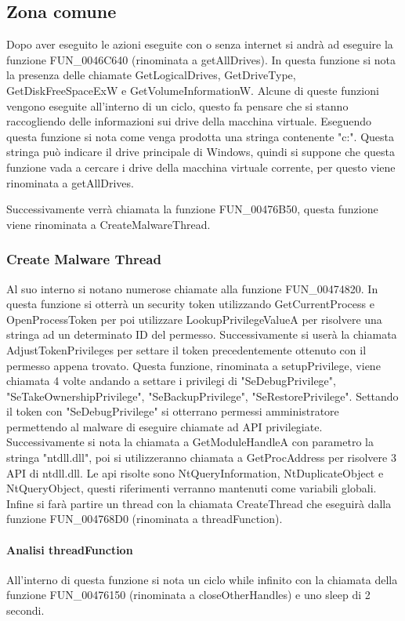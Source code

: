 \documentclass[a4paper,12pt]{article}
\begin{document}
\subsection{Zona comune}
Dopo aver eseguito le azioni eseguite con o senza internet si andrà ad eseguire la funzione FUN\_0046C640 (rinominata a getAllDrives). In questa funzione si nota la presenza delle chiamate GetLogicalDrives, GetDriveType, GetDiskFreeSpaceExW e GetVolumeInformationW. Alcune di queste funzioni vengono eseguite all'interno di un ciclo, questo fa pensare che si stanno raccogliendo delle informazioni sui drive della macchina virtuale. Eseguendo questa funzione si nota come venga prodotta una stringa contenente "c:". Questa stringa può indicare il drive principale di Windows, quindi si suppone che questa funzione vada a cercare i drive della macchina virtuale corrente, per questo viene rinominata a getAllDrives.

Successivamente verrà chiamata la funzione FUN\_00476B50, questa funzione viene rinominata a CreateMalwareThread. 

\subsubsection{Create Malware Thread}
Al suo interno si notano numerose chiamate alla funzione FUN\_00474820. In questa funzione si otterrà un security token utilizzando GetCurrentProcess e OpenProcessToken per poi utilizzare LookupPrivilegeValueA per risolvere una stringa ad un determinato ID del permesso. Successivamente si userà la chiamata AdjustTokenPrivileges per settare il token precedentemente ottenuto con il permesso appena trovato. Questa funzione, rinominata a setupPrivilege, viene chiamata 4 volte andando a settare i privilegi di "SeDebugPrivilege", "SeTakeOwnershipPrivilege", "SeBackupPrivilege", "SeRestorePrivilege".  Settando il token con "SeDebugPrivilege" si otterrano permessi amministratore permettendo al malware di eseguire chiamate ad API privilegiate.  
Successivamente si nota la chiamata a GetModuleHandleA con parametro la stringa "ntdll.dll", poi si utilizzeranno chiamata a GetProcAddress per risolvere 3 API di ntdll.dll. Le api risolte sono NtQueryInformation, NtDuplicateObject e NtQueryObject, questi riferimenti verranno mantenuti come variabili globali. Infine si farà partire un thread con la chiamata CreateThread che eseguirà dalla funzione FUN\_004768D0 (rinominata a threadFunction).

\paragraph{Analisi threadFunction}
All'interno di questa funzione si nota un ciclo while infinito con la chiamata della funzione FUN\_00476150 (rinominata a closeOtherHandles) e uno sleep di 2 secondi.
\end{document}
